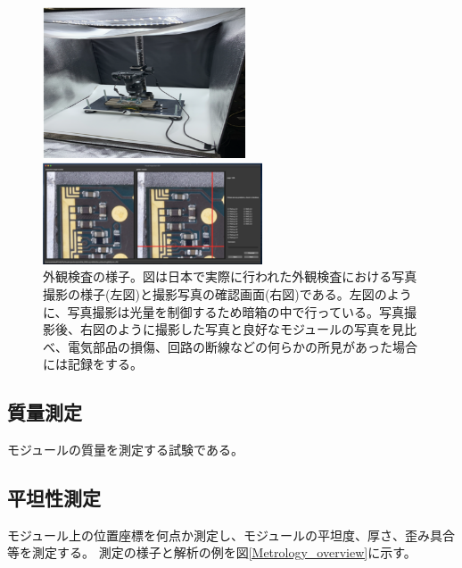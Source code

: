 \begin{figure}[bpt]\centering
  \begin{minipage}{0.4\hsize}
    \begin{center}
    \includegraphics[width=60mm]{./VI_setup.png}
    \end{center}
  \end{minipage}
  \begin{minipage}{0.4\hsize}
    \begin{center}
    \includegraphics[width=65mm]{./VI_analysis.png}
    \end{center}
  \end{minipage}
  \caption[外観検査の様子]{外観検査の様子。図は日本で実際に行われた外観検査における写真撮影の様子(左図)と撮影写真の確認画面(右図)である。左図のように、写真撮影は光量を制御するため暗箱の中で行っている。写真撮影後、右図のように撮影した写真と良好なモジュールの写真を見比べ、電気部品の損傷、回路の断線などの何らかの所見があった場合には記録をする。}
  \label{VI_overview}
\end{figure}

\subsection{質量測定}
モジュールの質量を測定する試験である。

\subsection{平坦性測定}
モジュール上の位置座標を何点か測定し、モジュールの平坦度、厚さ、歪み具合等を測定する。
測定の様子と解析の例を図\ref{Metrology_overview}に示す。

